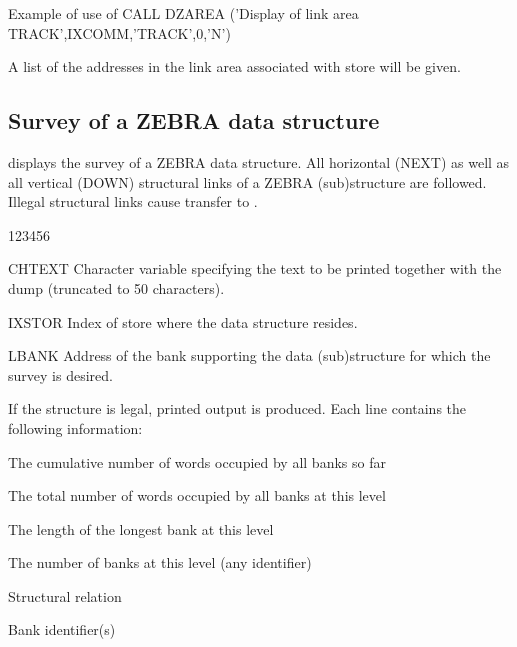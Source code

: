 \begin{XMPt}{Example of use of }
      CALL DZAREA ('Display of link area TRACK',IXCOMM,'TRACK',0,'N')
\end{XMPt}
A list of the addresses in the link area  associated
with store  will be given.

\subsection{Survey of a ZEBRA data structure}


\Action
{} displays the survey of a ZEBRA data structure.
All horizontal (NEXT) as well as all vertical (DOWN) structural
links of a ZEBRA (sub)structure are followed.
Illegal structural links cause transfer to .

\begin{DLtt}{123456}
\item[CHTEXT]Character variable specifying the text to be printed
together with the dump (truncated to 50 characters).
\item[IXSTOR]Index of store where the data structure resides.
\item[LBANK]Address of the bank supporting the data (sub)structure for which
the survey is desired.
\end{DLtt}
If the structure is legal, printed output is produced.
Each line contains the following information:
\begin{UL}
\item The cumulative number of words occupied by all banks so far
\item The total number of words occupied by all banks at this level
\item The length of the longest bank at this level
\item The number of banks at this level (any identifier)
\item Structural relation
\item Bank identifier(s)
\end{UL}

